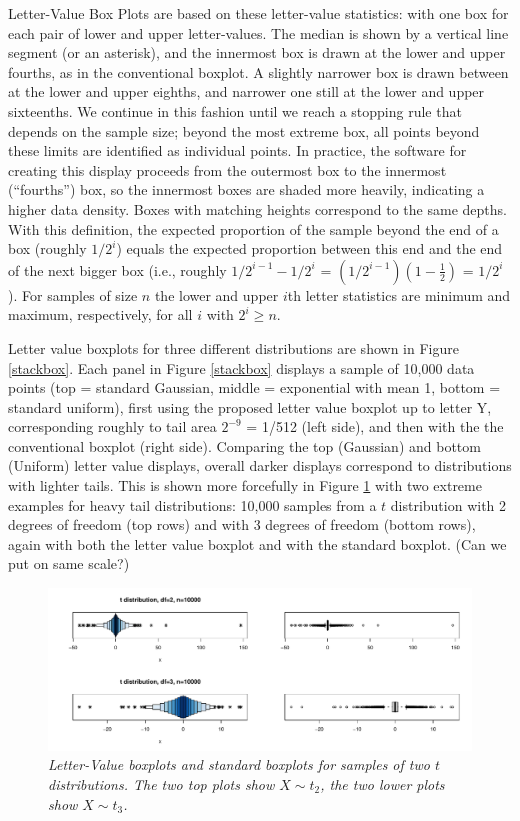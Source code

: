 \documentclass[11pt]{article}
\begin{document}
Letter-Value Box Plots are based on these letter-value statistics: 
with one box for each pair of lower and upper letter-values.
The median is shown by a vertical line segment (or an asterisk),
and the innermost box is drawn at the lower and upper fourths, 
as in the conventional boxplot.
A slightly narrower box is drawn between at the lower
and upper eighths, and narrower one still at the lower
and upper sixteenths.
We continue in this fashion until we reach a stopping
rule that depends on the sample size; beyond the
most extreme box, all points beyond these limits are
identified as individual points.
In practice, the software for creating this display
proceeds from the outermost box to the innermost (``fourths'')
box, so the innermost boxes are shaded more heavily,
indicating a higher data density.
Boxes with matching heights correspond to the same depths.
With this definition, the expected proportion of the 
sample beyond the end of a box (roughly $1/2^i$)
equals the expected proportion between this end 
and the end of the next bigger box
(i.e., roughly $1/2^{i-1} - 1/2^i$ = $(1/2^{i-1})(1 - \frac{1}{2})$
= $1 / 2^i$).
For samples of size $n$ the lower and upper $i$th letter statistics 
are minimum and maximum, respectively, for all $i$ with $2^i \ge n$. 

Letter value boxplots for three different distributions are 
shown in Figure \ref{stackbox}. 
Each panel in Figure \ref{stackbox} displays a sample of 10,000 
data points (top = standard Gaussian, middle = exponential 
with mean 1, bottom = standard uniform),
first using the proposed letter value boxplot
up to letter Y, corresponding roughly to tail area $2^{-9}$
= 1/512 (left side), and then with the
the conventional boxplot (right side).
Comparing the top (Gaussian) and bottom (Uniform) letter
value displays, overall darker displays correspond to distributions 
with lighter tails.  This is shown more forcefully in
Figure \ref{t-dist} with two extreme examples for heavy tail 
distributions: 10,000 samples from a $t$ distribution with 2 
degrees of freedom (top rows) and with 3 degrees of freedom 
(bottom rows), again with both the letter value boxplot and
with the standard boxplot. (Can we put on same scale?)

\begin{figure}[hbt]
\begin{center}
\includegraphics[width=6in]{t-distribution.pdf}
\caption{\it \label{t-dist} Letter-Value boxplots and standard boxplots 
for samples of two $t$ distributions. The two top plots 
show $X \sim t_2$, the two lower plots show $X \sim t_3$. }
\end{center}
\end{figure}
\end{document}
